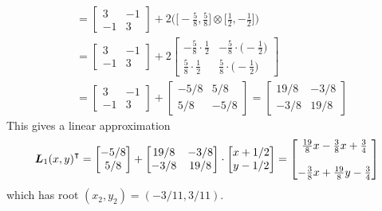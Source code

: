 \begin{example}
\begin{align*}
&= \begin{bmatrix} 3 & -1 \\ -1 & 3 \end{bmatrix} + 2 \big( \big[ -\tfrac{5}{8}, \tfrac{5}{8} \big] \otimes \big[ \tfrac{1}{2}, -\tfrac{1}{2} \big] \big) \\
&= \begin{bmatrix} 3 & -1 \\ -1 & 3 \end{bmatrix} + 2 \begin{bmatrix} -\tfrac{5}{8} \cdot \tfrac{1}{2} & -\tfrac{5}{8}\cdot \big( -\tfrac{1}{2} \big) \\ \tfrac{5}{8} \cdot \tfrac{1}{2} & \tfrac{5}{8} \cdot \big(- \tfrac{1}{2} \big) \end{bmatrix} \\
&= \begin{bmatrix} 3 & -1 \\ -1 & 3 \end{bmatrix} + \begin{bmatrix} -5/8 & 5/8 \\ 5/8 & -5/8 \end{bmatrix} = \begin{bmatrix} 19/8 & -3/8 \\ -3/8 & 19/8 \end{bmatrix}
\end{align*}
This gives a linear approximation 
\begin{equation*}
{\boldsymbol{L}_1(x,y)}^\intercal = \begin{bmatrix} -5/8 \\ 5/8 \end{bmatrix} + \begin{bmatrix} 19/8 & -3/8 \\ -3/8 & 19/8 \end{bmatrix} \cdot \begin{bmatrix} x + 1/2 \\ y - 1/2 \end{bmatrix} = \begin{bmatrix} \tfrac{19}{8}x-\tfrac{3}{8}x + \tfrac{3}{4} \\ \\ -\tfrac{3}{8}x+\tfrac{19}{8}y - \tfrac{3}{4} \end{bmatrix}
\end{equation*}
which has root $(x_2, y_2) = (-3/11, 3/11)$.


\end{example}
